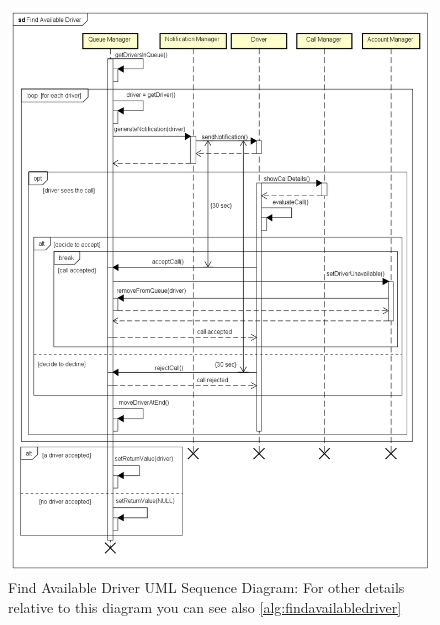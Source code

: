\documentclass[a4paper]{article}
\begin{document}
\begin{figure}[H]
\includegraphics[width=\sequenceWidth]{Sequence-FindAvailableDriver}
\centering
\caption[Find Available Driver UML Sequence Diagram]{Find Available Driver UML Sequence Diagram: \newline
\centering For other details relative to this diagram you can see also \autoref{alg:findavailabledriver}}
\label{fig:sequencefindavailabledriver}
\end{figure}
\end{document}
